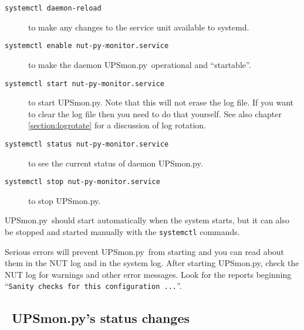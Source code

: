 \documentclass[12pt]{article}
\newlength{\headersep}\setlength{\headersep}{3mm}
\newcommand{\Hsep}{\hspace{\headersep}}
\newcommand{\newcolumn}{\vfill\eject}
\newcommand{\UPSmon}{\mbox{\textcolor{UPSMONCOLOUR}{UPSmon.py}}}
\begin{document}
\begin{description}

\item[\texttt{systemctl daemon-reload}] to make any changes to the service
  unit available to systemd.
\item[\texttt{systemctl enable nut-py-monitor.service}] to make the daemon
  \UPSmon\ operational and ``startable''.
\item[\texttt{systemctl start nut-py-monitor.service}] to start \UPSmon.  Note
  that this will not erase the log file.  If you want to clear the log file
  then you need to do that yourself. See also chapter \ref{section:logrotate}
  for a discussion of log rotation.
\item[\texttt{systemctl status nut-py-monitor.service}] to see the current
  status of daemon \UPSmon.
\item[\texttt{systemctl stop nut-py-monitor.service}] to stop \UPSmon.

\end{description}

\UPSmon\ should start automatically when the system starts, but it can also
be stopped and started manually with the \texttt{systemctl} commands.

Serious errors will prevent \UPSmon\ from starting and you can read about them
in the NUT log and in the system log.  After starting \UPSmon, check the NUT
log for warnings and other error messages.  Look for the reports beginning
``\texttt{Sanity checks for this configuration ...}''.

\vspace*{\fill}

\begin{center}
\end{center}

\vspace*{\fill}

\newcolumn
\subsection{\Hsep\ \UPSmon's status changes}\label{section:stch}
\end{document}

